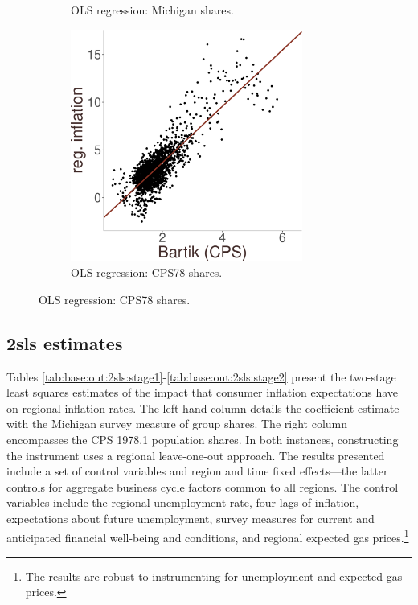 \documentclass[12pt]{article}
\begin{document}
\begin{figure}
\begin{subfigure}[t]{0.475\textwidth}
\caption{OLS regression: Michigan shares.}\label{subfig:redform:stage2:michigan}
\end{subfigure}
\begin{subfigure}[t]{0.475\textwidth}
\centering
\includegraphics[width =3in, height =3in]{figs/redform_cps}
\caption{OLS regression: CPS78 shares.}\label{subfig:redform:stage2:cps}
\end{subfigure}
\end{figure}


\subsection{2sls estimates}



Tables \ref{tab:base:out:2sls:stage1}-\ref{tab:base:out:2sls:stage2} present the two-stage least squares estimates of the impact that consumer inflation expectations have on regional inflation rates. The left-hand column details the coefficient estimate with the Michigan survey measure of group shares. The right column encompasses the CPS 1978.1 population shares. In both instances, constructing the instrument uses a regional leave-one-out approach. The results presented include a set of control variables and region and time fixed effects—the latter controls for aggregate business cycle factors common to all regions. The control variables include the regional unemployment rate, four lags of inflation, expectations about future unemployment, survey measures for current and anticipated financial well-being and conditions, and regional expected gas prices.\footnote{The results are robust to instrumenting for unemployment and expected gas prices.}



\end{document}
